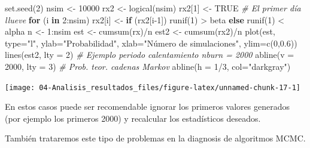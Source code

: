 \documentclass[
]{book}
\newenvironment{Shaded}{\begin{snugshade}}{\end{snugshade}}
\newcommand{\AttributeTok}[1]{\textcolor[rgb]{0.77,0.63,0.00}{#1}}
\newcommand{\CommentTok}[1]{\textcolor[rgb]{0.56,0.35,0.01}{\textit{#1}}}
\newcommand{\ConstantTok}[1]{\textcolor[rgb]{0.00,0.00,0.00}{#1}}
\newcommand{\ControlFlowTok}[1]{\textcolor[rgb]{0.13,0.29,0.53}{\textbf{#1}}}
\newcommand{\DecValTok}[1]{\textcolor[rgb]{0.00,0.00,0.81}{#1}}
\newcommand{\FloatTok}[1]{\textcolor[rgb]{0.00,0.00,0.81}{#1}}
\newcommand{\FunctionTok}[1]{\textcolor[rgb]{0.00,0.00,0.00}{#1}}
\newcommand{\NormalTok}[1]{#1}
\newcommand{\OtherTok}[1]{\textcolor[rgb]{0.56,0.35,0.01}{#1}}
\newcommand{\SpecialCharTok}[1]{\textcolor[rgb]{0.00,0.00,0.00}{#1}}
\newcommand{\StringTok}[1]{\textcolor[rgb]{0.31,0.60,0.02}{#1}}
\theoremstyle{break}
\theoremstyle{definition}
\theoremstyle{definition}
\theoremstyle{definition}
\theoremstyle{definition}
\theoremstyle{remark}
\begin{document}
\begin{Shaded}
\begin{Highlighting}[]
\FunctionTok{set.seed}\NormalTok{(}\DecValTok{2}\NormalTok{)}
\NormalTok{nsim }\OtherTok{\textless{}{-}} \DecValTok{10000}
\NormalTok{rx2 }\OtherTok{\textless{}{-}} \FunctionTok{logical}\NormalTok{(nsim)}
\NormalTok{rx2[}\DecValTok{1}\NormalTok{] }\OtherTok{\textless{}{-}} \ConstantTok{TRUE} \CommentTok{\# El primer día llueve}
\ControlFlowTok{for}\NormalTok{ (i }\ControlFlowTok{in} \DecValTok{2}\SpecialCharTok{:}\NormalTok{nsim)}
\NormalTok{  rx2[i] }\OtherTok{\textless{}{-}} \ControlFlowTok{if}\NormalTok{ (rx2[i}\DecValTok{{-}1}\NormalTok{]) }\FunctionTok{runif}\NormalTok{(}\DecValTok{1}\NormalTok{) }\SpecialCharTok{\textgreater{}}\NormalTok{ beta }\ControlFlowTok{else} \FunctionTok{runif}\NormalTok{(}\DecValTok{1}\NormalTok{) }\SpecialCharTok{\textless{}}\NormalTok{ alpha}
\NormalTok{n }\OtherTok{\textless{}{-}} \DecValTok{1}\SpecialCharTok{:}\NormalTok{nsim}
\NormalTok{est }\OtherTok{\textless{}{-}} \FunctionTok{cumsum}\NormalTok{(rx)}\SpecialCharTok{/}\NormalTok{n}
\NormalTok{est2 }\OtherTok{\textless{}{-}} \FunctionTok{cumsum}\NormalTok{(rx2)}\SpecialCharTok{/}\NormalTok{n}
\FunctionTok{plot}\NormalTok{(est, }\AttributeTok{type=}\StringTok{"l"}\NormalTok{, }\AttributeTok{ylab=}\StringTok{"Probabilidad"}\NormalTok{, }
     \AttributeTok{xlab=}\StringTok{"Número de simulaciones"}\NormalTok{, }\AttributeTok{ylim=}\FunctionTok{c}\NormalTok{(}\DecValTok{0}\NormalTok{,}\FloatTok{0.6}\NormalTok{))}
\FunctionTok{lines}\NormalTok{(est2, }\AttributeTok{lty =} \DecValTok{2}\NormalTok{)}
\CommentTok{\# Ejemplo periodo calentamiento nburn = 2000}
\FunctionTok{abline}\NormalTok{(}\AttributeTok{v =} \DecValTok{2000}\NormalTok{, }\AttributeTok{lty =} \DecValTok{3}\NormalTok{)}
\CommentTok{\# Prob. teor. cadenas Markov}
\FunctionTok{abline}\NormalTok{(}\AttributeTok{h =} \DecValTok{1}\SpecialCharTok{/}\DecValTok{3}\NormalTok{, }\AttributeTok{col=}\StringTok{"darkgray"}\NormalTok{)     }
\end{Highlighting}
\end{Shaded}

\begin{center}\texttt{[image: 04-Analisis\_resultados\_files/figure-latex/unnamed-chunk-17-1]} \end{center}

En estos casos puede ser recomendable ignorar los primeros valores generados (por ejemplo los primeros 2000) y recalcular los
estadísticos deseados.

También trataremos este tipo de problemas en la diagnosis de algoritmos MCMC.
\end{document}

